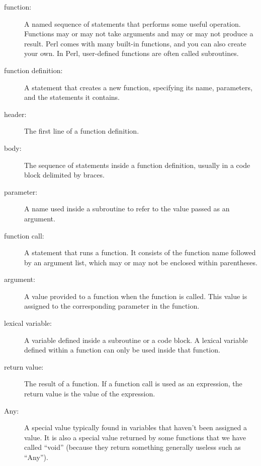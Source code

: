 \begin{description}

\item[function:] A named sequence of statements that performs 
some useful operation. Functions may or may not take arguments 
and may or may not produce a result. Perl comes with many 
built-in functions, and you can also create your own. In Perl, 
user-defined functions are often called subroutines.

\item[function definition:]  A statement that creates a new function,
specifying its name, parameters, and the statements it contains.

\item[header:] The first line of a function definition.

\item[body:] The sequence of statements inside a function 
definition, usually in a code block delimited by braces.

\item[parameter:] A name used inside a subroutine to refer to 
the value passed as an argument.

\item[function call:] A statement that runs a function. It
consists of the function name followed by an argument list, 
which may or may not be enclosed within parentheses.

\item[argument:]  A value provided to a function when the function is called.
This value is assigned to the corresponding parameter in the function.

\item[lexical variable:]  A variable defined inside a subroutine 
or a code block.  A lexical variable defined within a function can 
only be used inside that function.

\item[return value:]  The result of a function.  If a function call
is used as an expression, the return value is the value of
the expression.

\item[Any:]  A special value typically found in variables that 
haven't been assigned a value. It is also a special value 
returned by some functions that we have called ``void'' (because 
they return something generally useless such as ``Any'').


\end{description}
